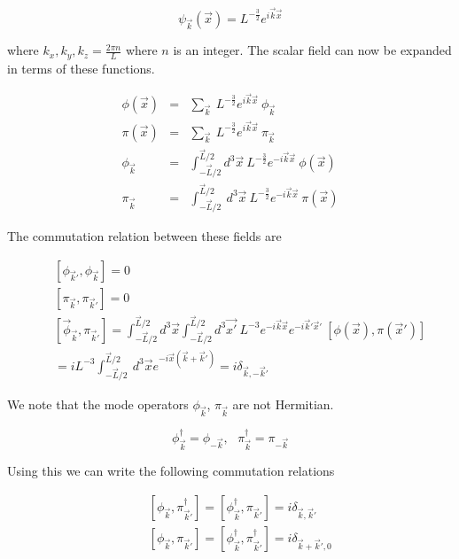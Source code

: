 \documentclass[aps,showpacs,onecolumn,floats,prd,superscriptaddress,nofootinbib]{revtex4-1}
\begin{document}
\begin{equation}
	\psi_{\vec{k}}(\vec{x}) = L^{-\frac{3}{2}} e^{i \vec{k} \vec{x}}
\end{equation}

where $k_x,k_y,k_z = \frac{2 \pi n}{L}$ where $n$ is an integer. 
The scalar field can now be expanded in terms of these functions. 

\begin{eqnarray}
	\phi(\vec{x}) & = & \sum_{\vec{k}} \ L^{-\frac{3}{2}} e^{i \vec{k} \vec{x}} \ \phi_{\vec{k}}	\nonumber	\\
	\pi(\vec{x}) & = & \sum_{\vec{k}} \ L^{-\frac{3}{2}} e^{i \vec{k} \vec{x}} \ \pi_{\vec{k}}	\nonumber	\\
	\phi_{\vec{k}} & = & \int^{\vec{L}/2}_{-\vec{L}/2} d^3 \vec{x} \ L^{-\frac{3}{2}} e^{-i \vec{k} \vec{x}} \ \phi(\vec{x})	\nonumber	\\
	 \pi_{\vec{k}} & = & \int^{\vec{L}/2}_{-\vec{L}/2} \ d^3 \vec{x} \ L^{-\frac{3}{2}} e^{-i \vec{k} \vec{x}} \ \pi(\vec{x})
\end{eqnarray}
	
The commutation relation between these fields are 

\begin{eqnarray}
	& & [\phi_{\vec{k}'}, \phi_{\vec{k}}] = 0	\nonumber	\\
	& & [\pi_{\vec{k}}, \pi_{\vec{k}'} ] = 0	\nonumber	\\
	& & [\vec{\phi}_{\vec{k}}, \pi_{\vec{k}'}] = \int^{\vec{L}/2}_{-\vec{L}/2} d^3 \vec{x}\int^{\vec{L}/2}_{-\vec{L}/2} d^3 \vec{x'} \ L^{-3} e^{-i \vec{k} \vec{x}} e^{-i \vec{k}' \vec{x}'} \ [\phi(\vec{x}), \pi(\vec{x}')]	\nonumber	\\
	& & = i L^{-3} \int^{\vec{L}/2}_{-\vec{L}/2} \ d^3 \vec{x} e^{-i\vec{x}(\vec{k} + \vec{k}')} = i \delta_{\vec{k},-\vec{k}'} 
\end{eqnarray}

We note that the mode operators $\phi_{\vec{k}}$, $\pi_{\vec{k}}$ are not Hermitian. 

\begin{equation}
	\phi^\dagger_{\vec{k}} = \phi_{- \vec{k}}, \ \ \ \pi^\dagger_{\vec{k}} = \pi_{- \vec{k}}
\end{equation}

Using this we can write the following commutation relations

\begin{eqnarray}
	& & [\phi_{\vec{k}}, \pi^\dagger_{\vec{k}'} ] = [\phi^\dagger_{\vec{k}}, \pi_{\vec{k}'}] = i \delta_{\vec{k}, \vec{k}'}	\nonumber	\\
	 & &  [\phi_{\vec{k}}, \pi_{\vec{k}'} ] = [\phi^\dagger_{\vec{k}}, \pi^\dagger_{\vec{k}'}] = i \delta_{\vec{k} + \vec{k}', 0}
\end{eqnarray}
\end{document}
